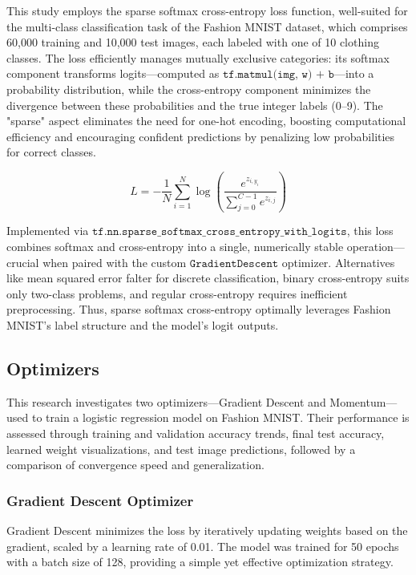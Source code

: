 \documentclass{article}
\begin{document}
This study employs the sparse softmax cross-entropy loss function, well-suited for the multi-class classification task of the Fashion MNIST dataset, which comprises 60,000 training and 10,000 test images, each labeled with one of 10 clothing classes. The loss efficiently manages mutually exclusive categories: its softmax component transforms logits—computed as \(\texttt{tf.matmul(img, w) + b}\)—into a probability distribution, while the cross-entropy component minimizes the divergence between these probabilities and the true integer labels (0–9). The "sparse" aspect eliminates the need for one-hot encoding, boosting computational efficiency and encouraging confident predictions by penalizing low probabilities for correct classes.

\begin{equation}
L = -\frac{1}{N} \sum_{i=1}^{N} \log\left(\frac{e^{z_{i, y_i}}}{\sum_{j=0}^{C-1} e^{z_{i, j}}}\right)
\end{equation}

Implemented via \(\texttt{tf.nn.sparse\_softmax\_cross\_entropy\_with\_logits}\), this loss combines softmax and cross-entropy into a single, numerically stable operation—crucial when paired with the custom \(\texttt{GradientDescent}\) optimizer. Alternatives like mean squared error falter for discrete classification, binary cross-entropy suits only two-class problems, and regular cross-entropy requires inefficient preprocessing. Thus, sparse softmax cross-entropy optimally leverages Fashion MNIST’s label structure and the model’s logit outputs.

\subsection{Optimizers}

This research investigates two optimizers—Gradient Descent and Momentum—used to train a logistic regression model on Fashion MNIST. Their performance is assessed through training and validation accuracy trends, final test accuracy, learned weight visualizations, and test image predictions, followed by a comparison of convergence speed and generalization.

\subsubsection{Gradient Descent Optimizer}

Gradient Descent minimizes the loss by iteratively updating weights based on the gradient, scaled by a learning rate of 0.01. The model was trained for 50 epochs with a batch size of 128, providing a simple yet effective optimization strategy.
\end{document}
